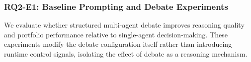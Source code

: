 \documentclass{article}
\begin{document}
\subsubsection{RQ2-E1: Baseline Prompting and Debate Experiments}
\label{exp:baseline-debate}
\vspace{-0.2cm}

We evaluate whether structured multi-agent debate improves reasoning quality and portfolio performance relative to single-agent decision-making. These experiments modify the debate configuration itself rather than introducing runtime control signals, isolating the effect of debate as a reasoning mechanism.


\end{document}
